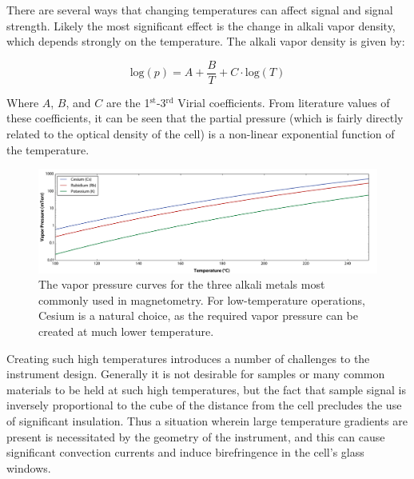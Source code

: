 \documentclass[PaulGanssle-Thesis.tex]{subfiles}
\begin{document}
There are several ways that changing temperatures can affect signal and signal strength. Likely the most significant effect is the change in alkali vapor density, which depends strongly on the temperature. The alkali vapor density is given by:\cite{Alcock1984,Ewing1969}

\begin{equation}
\mathrm{log}\left(p\right) = A + \frac{B}{T} + C\cdot\mathrm{log}\left(T\right)
\label{eqn:VirialExpansionAlkali}
\end{equation}

Where $A$, $B$, and $C$ are the 1$^{\mathrm{st}}$-3$^{\mathrm{rd}}$ Virial coefficients. From literature values of these coefficients, it can be seen that the partial pressure (which is fairly directly related to the optical density of the cell) is a non-linear exponential function of the temperature. 

\begin{figure}
\includegraphics[width=0.95\tw]{figures/magnetometer/AlkaliVaporPressures.pdf}
\caption{The vapor pressure curves for the three alkali metals most commonly used in magnetometry. For low-temperature operations, Cesium is a natural choice, as the required vapor pressure can be created at much lower temperature.}
\label{fig:AlkaliVaporPressures}
\end{figure}

Creating such high temperatures introduces a number of challenges to the instrument design. Generally it is not desirable for samples or many common materials to be held at such high temperatures, but the fact that sample signal is inversely proportional to the cube of the distance from the cell precludes the use of significant insulation. Thus a situation wherein large temperature gradients are present is necessitated by the geometry of the instrument, and this can cause significant convection currents and induce birefringence in the cell's glass windows.\cite{Carusotto1984}
\end{document}
